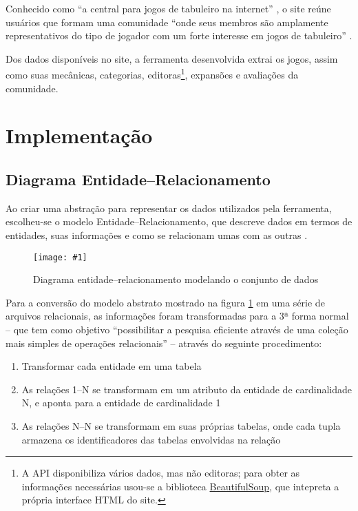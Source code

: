 \documentclass[hidelinks,12pt,article,twocolumn,brazil]{abntex2}
\newcommand{\imagem}[3]{\begin{figure}[htb]
    \begin{center}
        \texttt{[image: \#1]}\\
        \caption{#2}
        \label{#3}
    \end{center}
\end{figure}}
\begin{document}
Conhecido como ``a central para jogos de tabuleiro na internet'' \cite{draper2019bgg}, o site reúne usuários que formam uma comunidade ``onde seus membros são amplamente representativos do tipo de jogador com um forte interesse em jogos de tabuleiro'' \cite{woods2012eurogames}.

Dos dados disponíveis no site, a ferramenta desenvolvida extrai os jogos, assim como suas mecânicas, categorias, editoras\footnote{A API disponibiliza vários dados, mas não editoras; para obter as informações necessárias usou-se a biblioteca \href{https://www.crummy.com/software/BeautifulSoup/}{BeautifulSoup}, que intepreta a própria interface HTML do site.}, expansões e avaliações da comunidade.

\section{Implementação}

\subsection{Diagrama Entidade--Relacionamento}

Ao criar uma abstração para representar os dados utilizados pela ferramenta, escolheu-se o modelo Entidade--Relacionamento, que descreve dados em termos de entidades, suas informações e como se relacionam umas com as outras \cite{chen1976entity}.

\imagem{img/ER-CPD.png}{Diagrama entidade--relacionamento modelando o conjunto de dados}{diagrama_er}

Para a conversão do modelo abstrato mostrado na figura \ref{diagrama_er} em uma série de arquivos relacionais, as informações foram transformadas para a 3ª forma normal -- que tem como objetivo ``possibilitar a pesquisa eficiente através de uma coleção mais simples de operações relacionais'' \cite{codd1971normalized} -- através do seguinte procedimento:

\begin{enumerate}
    \item Transformar cada entidade em uma tabela
    \item As relações 1--N se transformam em um atributo da entidade de cardinalidade N, e aponta para a entidade de cardinalidade 1
    \item As relações N--N se transformam em suas próprias tabelas, onde cada tupla armazena os identificadores das tabelas envolvidas na relação
\end{enumerate}
\end{document}
